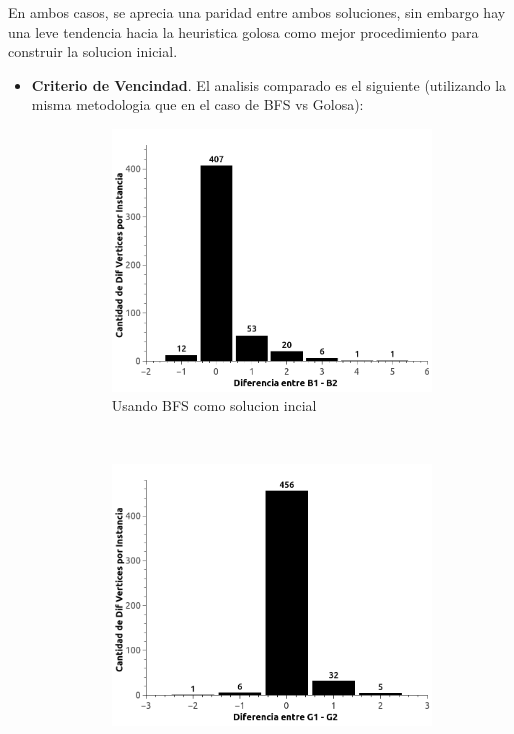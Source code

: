 En ambos casos, se aprecia una paridad entre ambos soluciones, sin embargo hay una leve tendencia hacia la heuristica golosa como mejor procedimiento para construir la solucion inicial.

\begin{itemize}
	\item \textbf{Criterio de Vencindad}. El analisis comparado es el siguiente (utilizando la misma metodologia que en el caso de BFS vs Golosa):

    \begin{figure}[H]
        \centering
        \begin{subfigure}[b]{0.5\textwidth}
                \includegraphics[width=\textwidth]{imagenes/ejer4-B1vsB2.jpg}
                \caption{Usando BFS como solucion incial}
        \end{subfigure}%
        ~ %
        \begin{subfigure}[b]{0.5\textwidth}
                \includegraphics[width=\textwidth]{imagenes/ejer4-G1vsG2.jpg}

\end{subfigure}
\end{figure}
\end{itemize}
